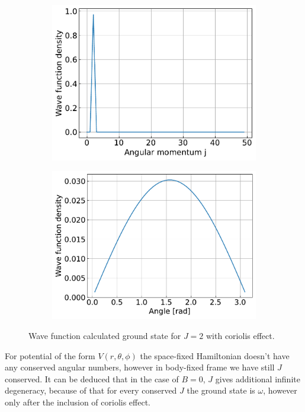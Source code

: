 \documentclass{article}
\begin{document}
\begin{figure}[H]
\begin{subfigure}{.4\linewidth}
            \includegraphics[width=\linewidth]{harmonic_iso_coriolis_angular.pdf}
        \end{subfigure}
        \begin{subfigure}{.4\linewidth}
            \centering
            \includegraphics[width=\linewidth]{harmonic_iso_coriolis_polar.pdf}
        \end{subfigure}   
        \caption{Wave function calculated ground state for $J = 2$ with coriolis effect.}
    \end{figure}

    For potential of the form $V(r, \theta, \phi)$ the space-fixed Hamiltonian doesn't have any
    conserved angular numbers, however in body-fixed frame we have still $J$ conserved.
    It can be deduced that in the case of $B = 0$, $J$ gives additional infinite degeneracy,
    because of that for every conserved $J$ the ground state is $\omega$, 
    however only after the inclusion of coriolis effect.
\end{document}

